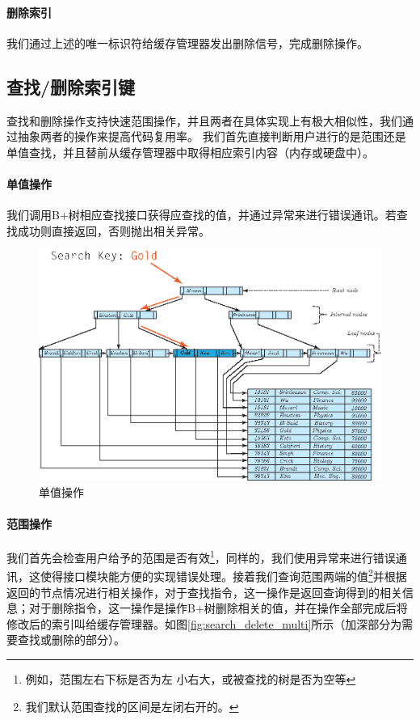 \documentclass[UTF8]{ctexrep} %
\begin{document}
\paragraph{删除索引}
我们通过上述的唯一标识符给缓存管理器发出删除信号，完成删除操作。

\subsection{查找/删除索引键}
查找和删除操作支持快速范围操作，并且两者在具体实现上有极大相似性，我们通过抽象两者的操作来提高代码复用率。
我们首先直接判断用户进行的是范围还是单值查找，并且替前从缓存管理器中取得相应索引内容（内存或硬盘中）。
\paragraph{单值操作}
我们调用B+树相应查找接口获得应查找的值，并通过异常来进行错误通讯。若查找成功则直接返回，否则抛出相关异常。
\begin{figure}[H]
    \centering
    \includegraphics[width=0.75\linewidth]{figure/search_delete_single.eps}
    \caption{单值操作}
    \label{fig:search_delete_single}
\end{figure}


\paragraph{范围操作}
我们首先会检查用户给予的范围是否有效\footnote{例如，范围左右下标是否为左 小右大，或被查找的树是否为空等}，同样的，我们使用异常来进行错误通讯，这使得接口模块能方便的实现错误处理。接着我们查询范围两端的值\footnote{我们默认范围查找的区间是左闭右开的。}并根据返回的节点情况进行相关操作，对于查找指令，这一操作是返回查询得到的相关信息；对于删除指令，这一操作是操作B+树删除相关的值，并在操作全部完成后将修改后的索引叫给缓存管理器。如图\ref{fig:search_delete_multi}所示（加深部分为需要查找或删除的部分）。
\end{document}

